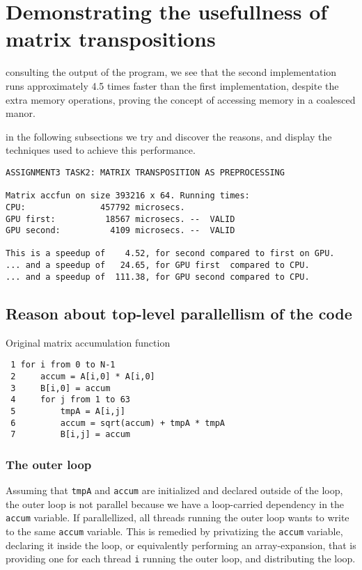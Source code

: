\documentclass[a4paper,10pt]{article}
\begin{document}
\newpage
\section{Demonstrating the usefullness of matrix transpositions}

consulting the output of the program, we see that the second implementation runs approximately 4.5 times faster than the first implementation, despite the extra memory operations, proving the concept of accessing memory in a coalesced manor.

in the following subsections we try and discover the reasons, and display the techniques used to achieve this performance.


\begin{verbatim}
ASSIGNMENT3 TASK2: MATRIX TRANSPOSITION AS PREPROCESSING

Matrix accfun on size 393216 x 64. Running times:
CPU:               457792 microsecs. 
GPU first:          18567 microsecs. --  VALID
GPU second:          4109 microsecs. --  VALID

This is a speedup of    4.52, for second compared to first on GPU.
... and a speedup of   24.65, for GPU first  compared to CPU.
... and a speedup of  111.38, for GPU second compared to CPU.
\end{verbatim}

\vfill

\subsection{Reason about top-level parallellism of the code}

Original matrix accumulation function
\begin{verbatim}
 1 for i from 0 to N-1
 2     accum = A[i,0] * A[i,0]
 3     B[i,0] = accum
 4     for j from 1 to 63
 5         tmpA = A[i,j]
 6         accum = sqrt(accum) + tmpA * tmpA
 7         B[i,j] = accum
\end{verbatim}

\subsubsection{The outer loop}
Assuming that \texttt{tmpA} and \texttt{accum} are initialized and declared outside of the loop, the outer loop is not parallel because we have a loop-carried dependency in the \texttt{accum} variable. If parallellized, all threads running the outer loop wants to write to the same \texttt{accum} variable. 
This is remedied by privatizing the \texttt{accum} variable, declaring it inside the loop, or equivalently performing an array-expansion, that is providing one for each thread \texttt{i} running the outer loop, and distributing the loop.
\end{document}
